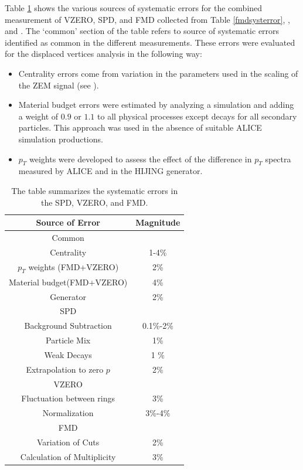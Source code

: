 \documentclass[11pt]{article}
\begin{document}
Table \ref{combinedsyst} shows the various sources of systematic
errors for the combined measurement of VZERO, SPD, and FMD collected
from Table \ref{fmdsysterror}, \cite{maxime}, and
\cite{ruben,Aamodt:2010cz}. The `common' section of the table refers
to source of systematic errors identified as common in the different
measurements. These errors were evaluated for the displaced vertices
analysis in the following way:
\begin{itemize}
\item Centrality errors come from variation in the parameters used in
  the scaling of the ZEM signal (see \cite{maxime}).
\item Material budget errors were estimated by analyzing a simulation
  and adding a weight of $0.9$ or $1.1$ to all physical processes
  except decays for all secondary particles. This approach was used in
  the absence of suitable ALICE simulation productions.
\item $p_T$ weights were developed to assess the effect of the
  difference in $p_T$ spectra measured by ALICE and in the HIJING
  generator.
\end{itemize}

\begin{table} 
  \centering
  \begin{tabular}{|c|c|}
    \hline
    Source of Error & Magnitude   \\
    \hline
    Common   &   \\
    \hline
    Centrality  & 1-4\%    \\
    \hline
    $p_T$ weights (FMD+VZERO)  & 2\%   \\
    \hline
    Material budget(FMD+VZERO)  & 4\%    \\
    \hline
    Generator  & 2\%    \\
    \hline
    SPD   &   \\
    \hline
    Background Subtraction & 0.1\%-2\%    \\
    \hline
    Particle Mix & 1\%   \\
    \hline
    Weak Decays & 1 \%   \\
    \hline
    Extrapolation to zero $p$ & 2\%    \\
    \hline
    VZERO &   \\
    \hline
    Fluctuation between rings & 3\%   \\
    \hline
    Normalization & 3\%-4\%   \\
    \hline
    FMD  &  \\
    \hline
    Variation of Cuts    &  2\%  \\
    \hline
    Calculation of Multiplicity    &  3\%  \\
    \hline
  \end{tabular}
  \caption[Combined Systematic Errors]{The table summarizes the
    systematic errors in the SPD\cite{ruben,Aamodt:2010cz},
    VZERO\cite{maxime}, and FMD\cite{hhd:2009}.} \label{combinedsyst}  
\end{table}
\end{document}

